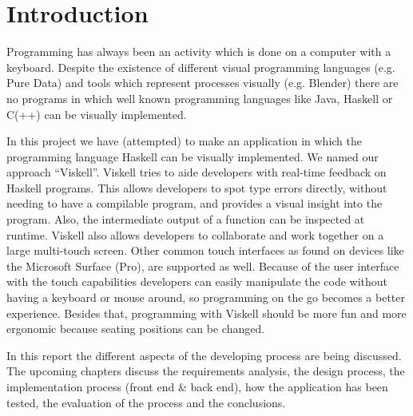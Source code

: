 \chapter{Introduction}

Programming has always been an activity which is done on a computer with a keyboard. Despite the existence of different visual programming languages (e.g. Pure Data) and tools which represent processes visually (e.g. Blender) there are no programs in which well known programming languages like Java, Haskell or C(++) can be visually implemented. 

In this project we have (attempted) to make an application in which the programming language Haskell can be visually implemented. We named our approach ``Viskell''. Viskell tries to aide developers with real-time feedback on Haskell programs. This allows developers to spot type errors directly, without needing to have a compilable program, and provides a visual insight into the program. Also, the intermediate output of a function can be inspected at runtime. Viskell also allows developers to collaborate and work together on a large multi-touch screen. Other common touch interfaces as found on devices like the Microsoft Surface (Pro), are supported as well. Because of the user interface with the touch capabilities developers can easily manipulate the code without having a keyboard or mouse around, so programming on the go becomes a better experience. Besides that,	 programming with Viskell should be more fun and more ergonomic because seating positions can be changed.

In this report the different aspects of the developing process are being discussed. The upcoming chapters discuss the requirements analysis, the design process, the implementation process (front end \& back end), how the application has been tested, the evaluation of the process and the conclusions. 